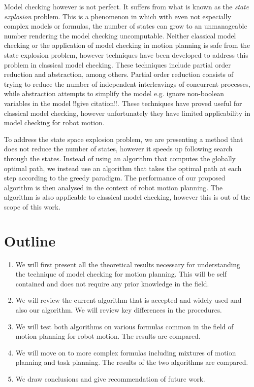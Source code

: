 Model checking however is not perfect. It suffers from what is known as the \textit{state explosion} problem. This is a phenomenon in which with even not especially complex models or formulas, the number of states can grow to an unmanageable number rendering the model checking uncomputable. Neither classical model checking or the application of model checking in motion planning is safe from the state explosion problem, however techniques have been developed to address this problem in classical model checking. These techniques include partial order reduction and abstraction, among others. Partial order reduction consists of trying to reduce the number of independent interleavings of concurrent processes, while abstraction attempts to simplify the model e.g. ignore non-boolean variables in the model !!give citation!!. These techniques have proved useful for classical model checking, however unfortunately they have limited applicability in model checking for robot motion.  

To address the state space explosion problem, we are presenting a method that does not reduce the number of states, however it speeds up following search through the states. Instead of using an algorithm that computes the globally optimal path, we instead use an algorithm that takes the optimal path at each step according to the greedy paradigm. The performance of our proposed algorithm is then analysed in the context of robot motion planning. The algorithm is also applicable to classical model checking, however this is out of the scope of this work. 

\section{Outline}
\begin{enumerate}
    \item We will first present all the theoretical results necessary for understanding the technique of model checking for motion planning. This will be self contained and does not require any prior knowledge in the field.
    \item We will review the current algorithm that is accepted and widely used and also our algorithm. We will review key differences in the procedures.
    \item We will test both algorithms on various formulas common in the field of motion planning for robot motion. The results are compared. %
    \item We will move on to more complex formulas including mixtures of motion planning and task planning. The results of the two algorithms are compared. 
    \item We draw conclusions and give recommendation of future work.
\end{enumerate}

